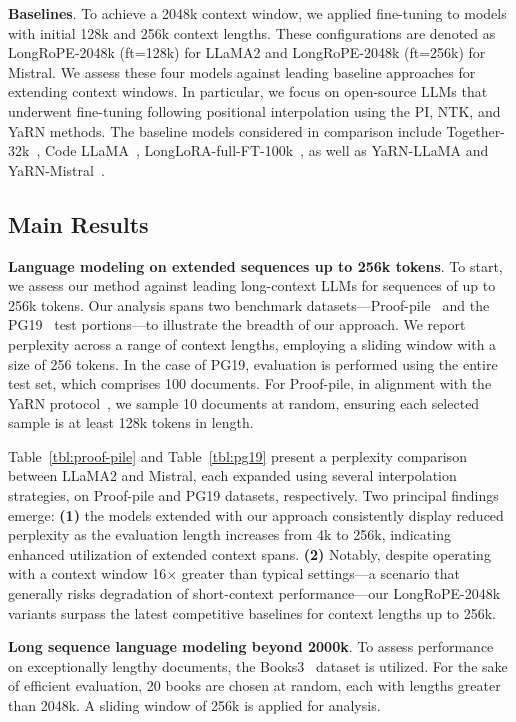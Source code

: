 \textbf{Baselines}. To achieve a 2048k context window, we applied fine-tuning to models with initial 128k and 256k context lengths. These configurations are denoted as LongRoPE-2048k (ft=128k) for LLaMA2 and LongRoPE-2048k (ft=256k) for Mistral. We assess these four models against leading baseline approaches for extending context windows. In particular, we focus on open-source LLMs that underwent fine-tuning following positional interpolation using the PI, NTK, and YaRN methods. The baseline models considered in comparison include Together-32k~\cite{together}, Code LLaMA~\cite{codellama}, LongLoRA-full-FT-100k~\cite{longlora}, as well as YaRN-LLaMA and YaRN-Mistral~\cite{yarn}.

\subsection{Main Results}

\label{sec:mainresult}
\textbf{Language modeling on extended sequences up to 256k tokens}. To start, we assess our method against leading long-context LLMs for sequences of up to 256k tokens. Our analysis spans two benchmark datasets—Proof-pile~\cite{pg19} and the PG19~\cite{pile} test portions—to illustrate the breadth of our approach. We report perplexity across a range of context lengths, employing a sliding window with a size of 256 tokens. In the case of PG19, evaluation is performed using the entire test set, which comprises 100 documents. For Proof-pile, in alignment with the YaRN protocol~\cite{yarn}, we sample 10 documents at random, ensuring each selected sample is at least 128k tokens in length.

Table~\ref{tbl:proof-pile} and Table~\ref{tbl:pg19} present a perplexity comparison between LLaMA2 and Mistral, each expanded using several interpolation strategies, on Proof-pile and PG19 datasets, respectively. Two principal findings emerge: \textbf{(1)} the models extended with our approach consistently display reduced perplexity as the evaluation length increases from 4k to 256k, indicating enhanced utilization of extended context spans. \textbf{(2)} Notably, despite operating with a context window 16$\times$ greater than typical settings—a scenario that generally risks degradation of short-context performance—our LongRoPE-2048k variants surpass the latest competitive baselines for context lengths up to 256k.

\textbf{Long sequence language modeling beyond 2000k}. To assess performance on exceptionally lengthy documents, the Books3~\cite{pile} dataset is utilized. For the sake of efficient evaluation, 20 books are chosen at random, each with lengths greater than 2048k. A sliding window of 256k is applied for analysis.

